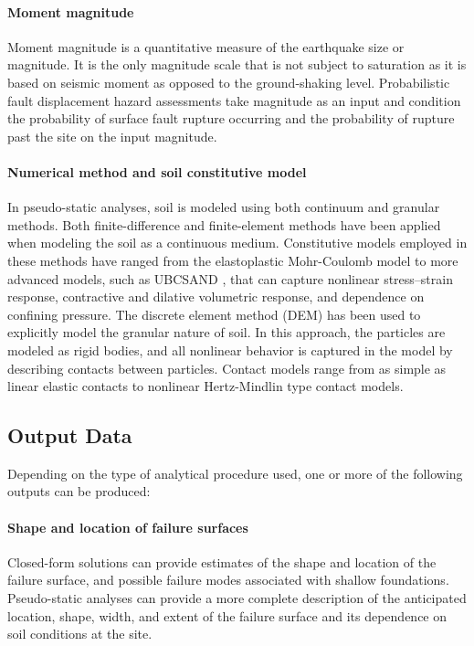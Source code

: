 \paragraph{Moment magnitude}
Moment magnitude is a quantitative measure of the earthquake size or magnitude. It is the only magnitude scale that is not subject to saturation as it is based on seismic moment as opposed to the ground-shaking level. Probabilistic fault displacement hazard assessments take magnitude as an input and condition the probability of surface fault rupture occurring and the probability of rupture past the site on the input magnitude.

\paragraph{Numerical method and soil constitutive model}
In pseudo-static analyses, soil is modeled using both continuum and granular methods. Both finite-difference and finite-element methods have been applied when modeling the soil as a continuous medium. Constitutive models employed in these methods have ranged from the elastoplastic Mohr-Coulomb model to more advanced models, such as UBCSAND \citep{byrne2004numerical}, that can capture nonlinear stress--strain response, contractive and dilative volumetric response, and dependence on confining pressure. The discrete element method (DEM) has been used to explicitly model the granular nature of soil. In this approach, the particles are modeled as rigid bodies, and all nonlinear behavior is captured in the model by describing contacts between particles. Contact models range from as simple as linear elastic contacts to nonlinear Hertz-Mindlin type contact models.

\subsection{Output Data}
Depending on the type of analytical procedure used, one or more of the following outputs can be produced:

\paragraph{Shape and location of failure surfaces}
Closed-form solutions can provide estimates of the shape and location of the failure surface, and possible failure modes associated with shallow foundations. Pseudo-static analyses can provide a more complete description of the anticipated location, shape, width, and extent of the failure surface and its dependence on soil conditions at the site. %

